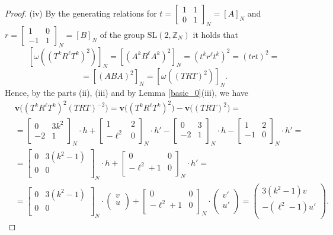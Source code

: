 \documentclass[10pt]{amsart}
\theoremstyle{plain}
\theoremstyle{definition}
\theoremstyle{remark}%
\newcommand{\Z}{\mathbb{Z}}
\newcommand{\f}{\mathbf{v}}
\newcommand{\g}{\omega}
\newcommand{\SL}{\mathrm{SL}}
\newcommand{\matN}[4]{\left[\begin{array}{cc}
 #1 & #2\\
 #3 & #4\\
\end{array}\right]_N}
\newcommand{\vc}[2]{\left(\begin{array}{c}
 #1 \\
 #2\\
\end{array}\right)}
\begin{document}
\begin{proof}
(iv) By the generating relations for 
$t=\left[\begin{smallmatrix}1 & 1\\ 0 & 1\end{smallmatrix}\right]_{N}=[A]_N$ and $r=\left[\begin{smallmatrix}1 & 0\\ -1 & 1\end{smallmatrix}\right]_{N}=[B]_N$ of the group $\SL(2,\Z_{N})$ it holds that $$\left[\g\left(\left(T^k R^\ell T^k\right)^{2}\right)\right]_{N}=\left[(A^kB^\ell A^k)^2\right]_N=(t^kr^{\ell}t^k)^2=(trt)^2=$$
$$=\left[(AB A)^2\right]_N=\left[\g\left(\left(T RT\right)^{2}\right)\right]_{N} .$$
Hence, by the parts (ii), (iii)  and by Lemma \ref{basic_0}(iii), we have 
\begin{align*}
&\f\Big(\left(T^k R^\ell T^k\right)^{2}\left(TRT\right)^{-2}\Big)=\f\Big(\left(T^k R^\ell T^k\right)^{2}\Big)-\f\Big(\left(TRT\right)^{2}\Big)=\\
&=\matN{0}{3k^2}{-2}{1}\cdot h+\matN{1}{2}{-\ell^2}{0}\cdot h'-\matN{0}{3}{-2}{1}\cdot h-\matN{1}{2}{-1}{0}\cdot h'=\\
&=\matN{0}{3(k^2-1)}{0}{0}\cdot h+\matN{0}{0}{-\ell^2+1}{0}\cdot h'=\\
&=\matN{0}{3(k^2-1)}{0}{0}\cdot \vc{v}{u}+\matN{0}{0}{-\ell^2+1}{0}\cdot \vc{v'}{u'}=\vc{3(k^2-1)v}{-(\ell^2-1)u'}.
\end{align*}
\end{proof}
\end{document}
